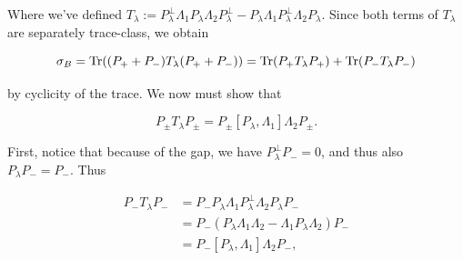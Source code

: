\documentclass[12pt, letterpaper]{article}
\begin{document}

Where we've defined $T_\lambda := P_\lambda^\perp \Lambda_1 P_\lambda\Lambda_2P_\lambda^\perp - P_\lambda\Lambda_1 P_\lambda^\perp \Lambda_2P_\lambda$. Since both terms of $T_\lambda$ are separately trace-class, we obtain

\[\sigma_B = \text{Tr}((P_++P_-)T_\lambda(P_++P_-)) = \text{Tr}(P_+T_\lambda P_+) + \text{Tr}(P_- T_\lambda P_-)\]

by cyclicity of the trace. We now must show that

\[P_\pm T_\lambda P_\pm = P_\pm [P_\lambda, \Lambda_1]\Lambda_2 P_\pm.\]

First, notice that because of the gap, we have $P_\lambda^\perp P_- = 0$, and thus also $P_\lambda P_- = P_-$. Thus

\[\begin{aligned}
P_- T_\lambda P_- &=  P_-P_\lambda \Lambda_1 P_\lambda^\perp \Lambda_2 P_\lambda P_-\\
&= P_-(P_\lambda\Lambda_1\Lambda_2 - \Lambda_1P_\lambda\Lambda_2)P_-\\
&= P_-[P_\lambda,\Lambda_1]\Lambda_2 P_-,
\end{aligned}\]
\end{document}
